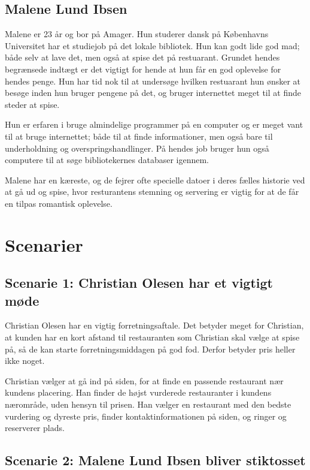 \documentclass[a4paper, 12pt]{article}
\begin{document}
\subsection{Malene Lund Ibsen}
Malene er 23 år og bor på Amager. Hun studerer dansk på Københavns Universitet har et studiejob på det lokale bibliotek. Hun kan godt lide god mad; både selv at lave det, men også at spise det på restuarant. Grundet hendes begrænsede indtægt er det vigtigt for hende at hun får en god oplevelse for hendes penge. Hun har tid nok til at undersøge hvilken restuarant hun ønsker at besøge inden hun bruger pengene på det, og bruger internettet meget til at finde steder at spise.

Hun er erfaren i bruge almindelige programmer på en computer og er meget vant til at bruge internettet; både til at finde informationer, men også bare til underholdning og overspringshandlinger. På hendes job bruger hun også computere til at søge bibliotekernes databaser igennem. 

Malene har en kæreste, og de fejrer ofte specielle datoer i deres fælles historie ved at gå ud og spise, hvor resturantens stemning og servering er vigtig for at de får en tilpas romantisk oplevelse.


\section{Scenarier}
\label{sec:Scenarier}

\subsection{Scenarie 1: Christian Olesen har et vigtigt møde}
\label{sub:Scenarie 1: Christian Olesen}
Christian Olesen har en vigtig forretningsaftale. Det betyder meget for
Christian, at kunden har en kort afstand til restauranten som Christian skal
vælge at spise på, så de kan starte forretningsmiddagen på god fod. Derfor
betyder pris heller ikke noget.

Christian vælger at gå ind på siden, for at finde en passende restaurant nær
kundens placering. Han finder de højst vurderede restauranter i kundens
nærområde, uden hensyn til prisen. Han vælger en restaurant med den bedste
vurdering og dyreste pris, finder kontaktinformationen på siden, og ringer og
reserverer plads.

\subsection{Scenarie 2: Malene Lund Ibsen bliver stiktosset}
\label{sub:Scenarie 2: Malene Lund Ibsen}
\end{document}
